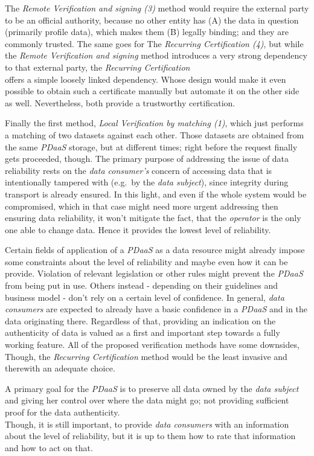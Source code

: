 \documentclass[12pt,english,a4paper,titlepage,cleardoublepage=empty,dottedtoc]{report}
\begin{document}
The \emph{Remote Verification and signing (3)} method would require the
external party to be an official authority, because no other entity has
(A) the data in question (primarily profile data), which makes them (B)
legally binding; and they are commonly trusted. The same goes for The
\emph{Recurring Certification (4)}, but while the \emph{Remote
Verification and signing} method introduces a very strong dependency to
that external party, the \emph{Recurring Certification}\\
offers a simple loosely linked dependency. Whose design would make it
even possible to obtain such a certificate manually but automate it on
the other side as well. Nevertheless, both provide a trustworthy
certification.

Finally the first method, \emph{Local Verification by matching (1)},
which just performs a matching of two datasets against each other. Those
datasets are obtained from the same \emph{PDaaS} storage, but at
different times; right before the request finally gets proceeded,
though. The primary purpose of addressing the issue of data reliability
rests on the \emph{data consumer's} concern of accessing data that is
intentionally tampered with (e.g.~by the \emph{data subject}), since
integrity during transport is already ensured. In this light, and even
if the whole system would be compromised, which in that case might need
more urgent addressing then ensuring data reliability, it won't mitigate
the fact, that the \emph{operator} is the only one able to change data.
Hence it provides the lowest level of reliability.

Certain fields of application of a \emph{PDaaS} as a data resource might
already impose some constraints about the level of reliability and maybe
even how it can be provide. Violation of relevant legislation or other
rules might prevent the \emph{PDaaS} from being put in use. Others
instead - depending on their guidelines and business model - don't rely
on a certain level of confidence. In general, \emph{data consumers} are
expected to already have a basic confidence in a \emph{PDaaS} and in the
data originating there. Regardless of that, providing an indication on
the authenticity of data is valued as a first and important step towards
a fully working feature. All of the proposed verification methods have
some downsides, Though, the \emph{Recurring Certification} method would
be the least invasive and therewith an adequate choice.

A primary goal for the \emph{PDaaS} is to preserve all data owned by the
\emph{data subject} and giving her control over where the data might go;
not providing sufficient proof for the data authenticity.\\
Though, it is still important, to provide \emph{data consumers} with an
information about the level of reliability, but it is up to them how to
rate that information and how to act on that.
\end{document}

